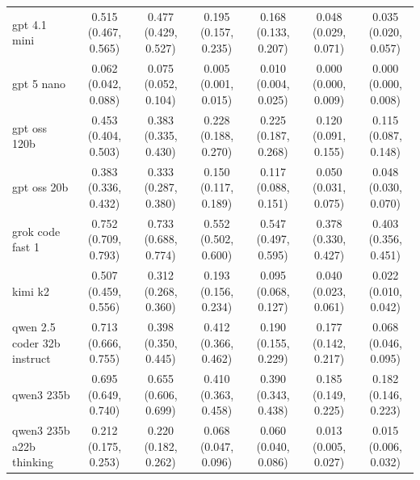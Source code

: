 \begin{table}[h!]
{\begin{tabular}{lcccccc}
gpt 4.1 mini & \cellcolor{green!40}0.515 (0.467, 0.565) & \cellcolor{green!50}0.477 (0.429, 0.527) & \cellcolor{green!35}0.195 (0.157, 0.235) & \cellcolor{green!35}0.168 (0.133, 0.207) & \cellcolor{green!35}0.048 (0.029, 0.071) & \cellcolor{green!30}0.035 (0.020, 0.057) \\
gpt 5 nano & \cellcolor{green!5}0.062 (0.042, 0.088) & \cellcolor{green!5}0.075 (0.052, 0.104) & \cellcolor{green!5}0.005 (0.001, 0.015) & \cellcolor{green!5}0.010 (0.004, 0.025) & \cellcolor{green!5}0.000 (0.000, 0.009) & \cellcolor{green!5}0.000 (0.000, 0.008) \\
gpt oss 120b & \cellcolor{green!30}0.453 (0.404, 0.503) & \cellcolor{green!35}0.383 (0.335, 0.430) & \cellcolor{green!40}0.228 (0.188, 0.270) & \cellcolor{green!55}0.225 (0.187, 0.268) & \cellcolor{green!50}0.120 (0.091, 0.155) & \cellcolor{green!60}0.115 (0.087, 0.148) \\
gpt oss 20b & \cellcolor{green!25}0.383 (0.336, 0.432) & \cellcolor{green!30}0.333 (0.287, 0.380) & \cellcolor{green!25}0.150 (0.117, 0.189) & \cellcolor{green!30}0.117 (0.088, 0.151) & \cellcolor{green!40}0.050 (0.031, 0.075) & \cellcolor{green!35}0.048 (0.030, 0.070) \\
grok code fast 1 & \cellcolor{green!80}0.752 (0.709, 0.793) & \cellcolor{green!85}0.733 (0.688, 0.774) & \cellcolor{green!80}0.552 (0.502, 0.600) & \cellcolor{green!80}0.547 (0.497, 0.595) & \cellcolor{green!80}0.378 (0.330, 0.427) & \cellcolor{green!80}0.403 (0.356, 0.451) \\
kimi k2 & \cellcolor{green!35}0.507 (0.459, 0.556) & \cellcolor{green!20}0.312 (0.268, 0.360) & \cellcolor{green!30}0.193 (0.156, 0.234) & \cellcolor{green!20}0.095 (0.068, 0.127) & \cellcolor{green!25}0.040 (0.023, 0.061) & \cellcolor{green!14}0.022 (0.010, 0.042) \\
qwen 2.5 coder 32b instruct & \cellcolor{green!75}0.713 (0.666, 0.755) & \cellcolor{green!45}0.398 (0.350, 0.445) & \cellcolor{green!75}0.412 (0.366, 0.462) & \cellcolor{green!40}0.190 (0.155, 0.229) & \cellcolor{green!60}0.177 (0.142, 0.217) & \cellcolor{green!45}0.068 (0.046, 0.095) \\
qwen3 235b & \cellcolor{green!70}0.695 (0.649, 0.740) & \cellcolor{green!70}0.655 (0.606, 0.699) & \cellcolor{green!70}0.410 (0.363, 0.458) & \cellcolor{green!70}0.390 (0.343, 0.438) & \cellcolor{green!65}0.185 (0.149, 0.225) & \cellcolor{green!70}0.182 (0.146, 0.223) \\
qwen3 235b a22b thinking & \cellcolor{green!5}0.212 (0.175, 0.253) & \cellcolor{green!5}0.220 (0.182, 0.262) & \cellcolor{green!5}0.068 (0.047, 0.096) & \cellcolor{green!5}0.060 (0.040, 0.086) & \cellcolor{green!5}0.013 (0.005, 0.027) & \cellcolor{green!5}0.015 (0.006, 0.032) \\

\end{tabular}}
\end{table}

